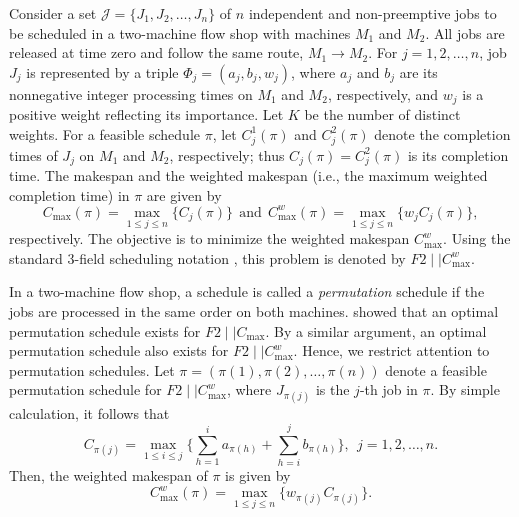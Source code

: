 \documentclass[12pt]{article} \textheight=24.5cm \textwidth=16.5cm \parskip = 0.165cm
\begin{document}
\begin{sloppypar}
        Consider a set $\mathcal{J} = \{J_1, J_2, \dots, J_n\}$ of $n$ independent and non-preemptive jobs to be scheduled in a two-machine flow shop with machines $M_1$ and $M_2$.
        All jobs are released at time zero and follow the same route, $M_1 \to M_2$.
        For $j=1, 2, \ldots, n$, job $J_j$ is represented by a triple $\Phi_j=(a_j, b_j, w_j)$, where $a_j$ and $b_j$ are its nonnegative integer processing times on $M_1$ and $M_2$, respectively, and $w_j$ is a positive weight reflecting its importance.
        Let $K$ be the number of distinct weights.
        For a feasible schedule $\pi$, let $C_j^1(\pi)$ and $C_j^2(\pi)$ denote the completion times of $J_j$ on $M_1$ and $M_2$, respectively; thus $C_j(\pi)=C_j^2(\pi)$ is its completion time.
        The makespan and the weighted makespan (i.e., the maximum weighted completion time) in $\pi$ are given by
        \begin{equation*}
            C_{\max}(\pi)=\max_{1 \leq j \leq n} \{C_j(\pi)\} ~~ \mathrm{and} ~~ C_{\max}^w(\pi)=\max_{1 \leq j \leq n} \{w_j C_j(\pi)\},
        \end{equation*}
        respectively.
        The objective is to minimize the weighted makespan $C_{\max}^w$.
        Using the standard 3-field scheduling notation \citep{Pinedo2022scheduling}, this problem is denoted by $F2 \mid \mid C_{\max}^w$.
        
        In a two-machine flow shop, a schedule is called a \textit{permutation} schedule if the jobs are processed in the same order on both machines.
        \cite{Johnson1954NRL} showed that an optimal permutation schedule exists for $F2 \mid \mid C_{\max}$.
        By a similar argument, an optimal permutation schedule also exists for $F2 \mid \mid C_{\max}^w$.
        Hence, we restrict  attention to permutation schedules.
        Let $\pi = (\pi(1), \pi(2), \ldots, \pi(n))$ denote a feasible permutation schedule for $F2 \mid \mid C_{\max}^w$, where $J_{\pi(j)}$ is the $j$-th job in $\pi$.
        By simple calculation, it follows that
        \begin{equation}\label{eq:completion}
            C_{\pi(j)} = \max_{1 \leq i \leq j} \Big\{\sum_{h=1}^{i}a_{\pi(h)} + \sum_{h=i}^{j}b_{\pi(h)} \Big\}, ~~ j=1, 2, \ldots, n.
        \end{equation}
        Then, the weighted makespan of $\pi$ is given by
        \begin{equation}\label{eq:wcmax}
            C_{\max}^w(\pi)=\max_{1 \leq j \leq n}\{ w_{\pi(j)} C_{\pi(j)}\}.
        \end{equation}
        

\end{sloppypar}
\end{document}
